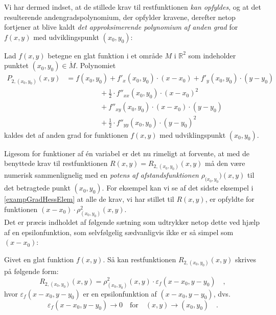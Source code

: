 Vi har dermed indset, at de stillede krav til restfunktionen {\textit{kan opfyldes}}, og at
det resulterende andengradspolynomium, der opfylder kravene, derefter netop fortjener at blive kaldt {\textit{det approksimerende polynomium af anden grad}} for $f(x,y)$ med udviklingspunkt $(x_{0}, y_{0})$:

\begin{definition}\label{defApp2Pol}
Lad $f(x,y)$ betegne en glat funktion i et område $M$ i $\mathbb{R}^{2}$ som indeholder punktet $(x_{0}, y_{0}) \in \mathring{M}$. Polynomiet
\begin{equation}
\begin{aligned}
P_{2, (x_{0}, y_{0})}(x,y) &= f(x_{0}, y_{0}) + f'_{x}(x_{0}, y_{0})\cdot (x-x_{0}) + f'_{y}(x_{0}, y_{0})\cdot (y-y_{0}) \\
&\phantom{abcdefghij}+ \frac{1}{2}\cdot f''_{xx}(x_{0}, y_{0})\cdot (x-x_{0})^{2}  \\
&\phantom{abcdefghij}+ f''_{xy}(x_{0}, y_{0})\cdot (x-x_{0})\cdot (y-y_{0}) \\
&\phantom{abcdefghij}+ \frac{1}{2} \cdot f''_{yy}(x_{0}, y_{0}) \cdot (y-y_{0})^{2}
\end{aligned}
\end{equation}
kaldes det  af anden grad for funktionen $f(x,y)$ med udviklingspunkt $(x_{0}, y_{0})$.
\end{definition}

Ligesom for funktioner af \'{e}n variabel er det nu rimeligt at forvente, at med de benyttede krav til restfunktionen $R(x,y) = R_{2, (x_{0}, y_{0})}(x,y)$  må den være numerisk sammenlignelig med en {\textit{potens af afstandsfunktionen}} $\rho_{(x_{0}, y_{0}})(x,y)$ til det betragtede punkt $(x_{0}, y_{0})$. For eksempel kan vi se af det sidste eksempel i \ref{exampGradHessElem} at alle de krav, vi har stillet til $R(x,y)$, er opfyldte for funktionen $(x-x_{0})\cdot \rho^{2}_{(x_{0}, y_{0})}(x,y)$.\\

Det er præcis indholdet af følgende sætning som udtrykker netop dette ved hjælp af en epsilonfunktion, som selvfølgelig sædvanligvis ikke er så simpel som $(x - x_{0})$:

\begin{lemma}\label{lemmaRestfunk2var}
Givet en glat funktion $f(x,y)$. Så kan restfunktionen $R_{2, (x_{0}, y_{0})}(x,y)$  skrives på følgende form:
\begin{equation}
R_{2, (x_{0}, y_{0})}(x,y) = \rho^{2}_{(x_{0}, y_{0})}(x,y)\cdot \varepsilon_{f}(x-x_{0}, y-y_{0}) \quad ,
\end{equation}
hvor $\varepsilon_{f}(x-x_{0}, y-y_{0})$ er en epsilonfunktion af $(x-x_{0}, y-y_{0})$, dvs.
\begin{equation}
\varepsilon_{f}(x-x_{0}, y-y_{0}) \to 0 \quad \textrm{for} \quad (x, y) \to (x_{0}, y_{0}) \quad .
\end{equation}
\end{lemma}

